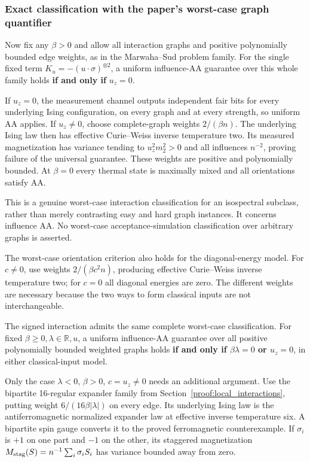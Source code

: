 \subsubsection{Exact classification with the paper's worst-case graph
quantifier}\label{quant:heading-8}

Now fix any \(\beta>0\) and allow all interaction graphs and positive
polynomially bounded edge weights, as in the Marwaha--Sud problem
family. For the single fixed term \(K_u=-(u\cdot\sigma)^{\otimes2}\), a
uniform influence-AA guarantee over this whole family holds \textbf{if
and only if} \(u_z=0\).

If \(u_z=0\), the measurement channel outputs independent fair bits for
every underlying Ising configuration, on every graph and at every
strength, so uniform AA applies. If \(u_z\ne0\), choose complete-graph
weights \(2/(\beta n)\). The underlying Ising law then has effective
Curie--Weiss inverse temperature two. Its measured magnetization has
variance tending to \(u_z^2m_2^2>0\) and all influences \(n^{-2}\),
proving failure of the universal guarantee. These weights are positive
and polynomially bounded. At \(\beta=0\) every thermal state is
maximally mixed and all orientations satisfy AA.

This is a genuine worst-case interaction classification for an
isospectral subclass, rather than merely contrasting easy and hard graph
instances. It concerns influence AA. No worst-case acceptance-simulation
classification over arbitrary graphs is asserted.

The worst-case orientation criterion also holds for the diagonal-energy
model. For \(c\ne0\), use weights \(2/(\beta c^2n)\), producing
effective Curie--Weiss inverse temperature two; for \(c=0\) all diagonal
energies are zero. The different weights are necessary because the two
ways to form classical inputs are not interchangeable.

The signed interaction admits the same complete worst-case
classification. For fixed \(\beta\ge0,\lambda\in\mathbb R,u\), a uniform
influence-AA guarantee over all positive polynomially bounded weighted
graphs holds \textbf{if and only if \(\beta\lambda=0\) or \(u_z=0\)}, in
either classical-input model.

Only the case \(\lambda<0\), \(\beta>0\), \(c=u_z\ne0\) needs an
additional argument. Use the bipartite 16-regular expander family from
Section~\ref{proof:local_interactions},
putting weight \(6/(16\beta|\lambda|)\) on every edge. Its underlying
Ising law is the antiferromagnetic normalized expander law at effective
inverse temperature six. A bipartite spin gauge converts it to the
proved ferromagnetic counterexample. If \(\sigma_i\) is \(+1\) on one
part and \(-1\) on the other, its staggered magnetization
\(M_{\rm stag}(S)=n^{-1}\sum_i\sigma_iS_i\) has variance bounded away
from zero.

